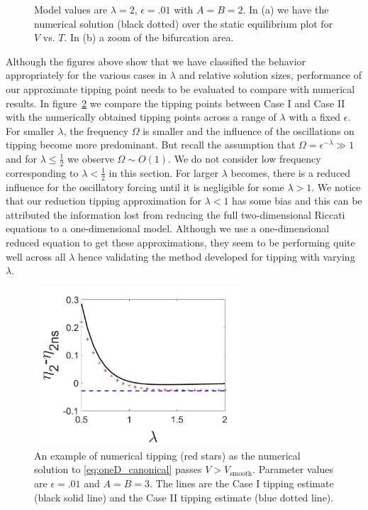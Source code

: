 \begin{figure}[H]
\begin{subfigure}{.5\textwidth}
 \caption{}
\end{subfigure}
\caption{Model values are $\lambda=2$, $\epsilon=.01$ with $A=B=2$. In (a) we have the numerical solution (black dotted) over the static equilibrium plot for $V$ vs. $T$. In (b) a zoom of the bifurcation area.}
\label{fig:twoD_slowosc_Tnumerics_large}
\end{figure}

Although the figures above show that we have classified the behavior appropriately for the various cases in $\lambda$ and relative solution sizes, performance of our approximate tipping point needs to be evaluated to compare with numerical results. In figure~\ref{fig:twoD_slowosc_lambdacomp} we compare the tipping points between Case I and Case II with the numerically obtained tipping points across a range of $\lambda$ with a fixed $\epsilon$. For smaller $\lambda$, the frequency $\Omega$ is smaller and the influence of the oscillations on tipping become more predominant. But recall the assumption that $\Omega=\epsilon^{-\lambda}\gg 1$ and for $\lambda\le\frac{1}{2}$ we observe $\Omega\sim O(1)$. We do not consider low frequency corresponding to $\lambda<\frac{1}{2}$ in this section. For larger $\lambda$ becomes, there is a reduced influence for the oscillatory forcing until it is negligible for some $\lambda>1$. We notice that our reduction tipping approximation for $\lambda<1$ has some bias and this can be attributed the information lost from reducing the full two-dimensional Riccati equations to a one-dimensional model. Although we use a one-dimensional reduced equation to get these approximations, they seem to be performing quite well across all $\lambda$ hence validating the method developed for tipping with varying $\lambda$.

\begin{figure}[H]
\centering
\includegraphics[width=0.7\textwidth]{twoD/slowosc_lambdacomp.jpg}
\caption{An example of numerical tipping (red stars) as the numerical solution to \eqref{eq:oneD_canonical} passes $V>V_{\text{smooth}}$. Parameter values are $\epsilon=.01$ and $A=B=3$. The lines are the Case I tipping estimate (black solid line) and the Case II tipping estimate (blue dotted line).}
\label{fig:twoD_slowosc_lambdacomp}
\end{figure} 

